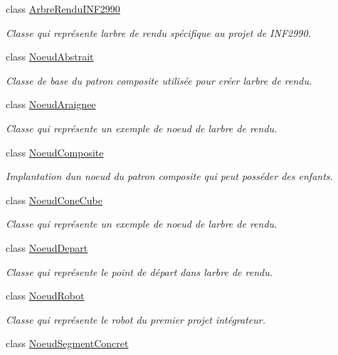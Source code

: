 \begin{DoxyCompactItemize}
class \hyperlink{class_arbre_rendu_i_n_f2990}{Arbre\+Rendu\+I\+N\+F2990}
\begin{DoxyCompactList}\small\item\em Classe qui représente l\textquotesingle{}arbre de rendu spécifique au projet de I\+N\+F2990. \end{DoxyCompactList}\item 
class \hyperlink{class_noeud_abstrait}{Noeud\+Abstrait}
\begin{DoxyCompactList}\small\item\em Classe de base du patron composite utilisée pour créer l\textquotesingle{}arbre de rendu. \end{DoxyCompactList}\item 
class \hyperlink{class_noeud_araignee}{Noeud\+Araignee}
\begin{DoxyCompactList}\small\item\em Classe qui représente un exemple de noeud de l\textquotesingle{}arbre de rendu. \end{DoxyCompactList}\item 
class \hyperlink{class_noeud_composite}{Noeud\+Composite}
\begin{DoxyCompactList}\small\item\em Implantation d\textquotesingle{}un noeud du patron composite qui peut posséder des enfants. \end{DoxyCompactList}\item 
class \hyperlink{class_noeud_cone_cube}{Noeud\+Cone\+Cube}
\begin{DoxyCompactList}\small\item\em Classe qui représente un exemple de noeud de l\textquotesingle{}arbre de rendu. \end{DoxyCompactList}\item 
class \hyperlink{class_noeud_depart}{Noeud\+Depart}
\begin{DoxyCompactList}\small\item\em Classe qui représente le point de départ dans l\textquotesingle{}arbre de rendu. \end{DoxyCompactList}\item 
class \hyperlink{class_noeud_robot}{Noeud\+Robot}
\begin{DoxyCompactList}\small\item\em Classe qui représente le robot du premier projet intégrateur. \end{DoxyCompactList}\item 
class \hyperlink{class_noeud_segment_concret}{Noeud\+Segment\+Concret}

\end{DoxyCompactItemize}
